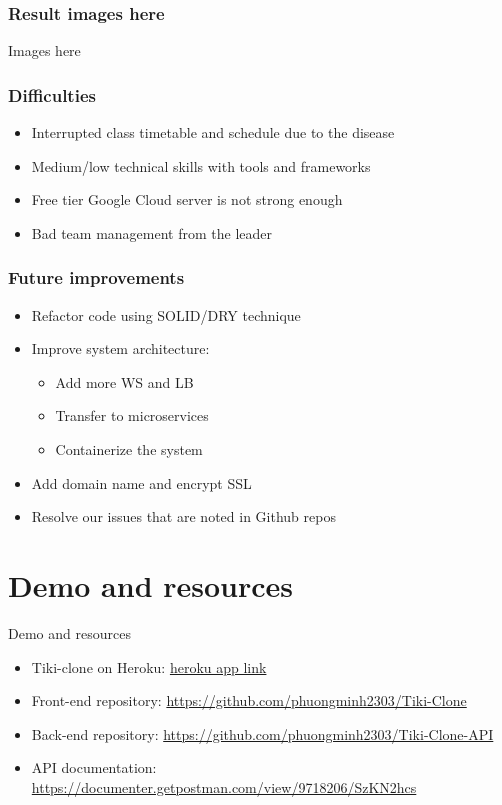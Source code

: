 \documentclass{beamer}
\begin{document}
\begin{frame}[fragile]
\frametitle{Result images here}
    Images here
\end{frame} 
    
\begin{frame}[fragile]
\frametitle{Difficulties}
    \begin{itemize}
    	\item Interrupted class timetable and schedule due to the disease
    	\item Medium/low technical skills with tools and frameworks
        \item Free tier Google Cloud server is not strong enough
        \item Bad team management from the leader
	\end{itemize}
\end{frame}    

\begin{frame}[fragile]
\frametitle{Future improvements}
    \begin{itemize}
    	\item Refactor code using SOLID/DRY technique
    	\item Improve system architecture: 
    	    \begin{itemize}
    	        \item Add more WS and LB
    	        \item Transfer to microservices
    	        \item Containerize the system
    	    \end{itemize}
        \item Add domain name and encrypt SSL
        \item Resolve our issues that are noted in Github repos
	\end{itemize}
\end{frame}

\section{Demo and resources}
	
\begin{frame}{Demo and resources}
	\begin{itemize}
	    \item Tiki-clone on Heroku: \url{heroku app link}
	    \item Front-end repository: \url{https://github.com/phuongminh2303/Tiki-Clone}
	    \item Back-end repository: \url{https://github.com/phuongminh2303/Tiki-Clone-API}
	    \item API documentation: \url{https://documenter.getpostman.com/view/9718206/SzKN2hcs}
	\end{itemize}
\end{frame}
\end{document}
